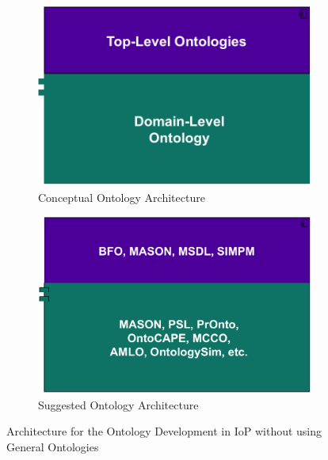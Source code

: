 \documentclass{guideline/sty/rapport}
\begin{document}
\begin{figure}[H]
    \begin{subfigure}[t]{0.45\textwidth}
        \includegraphics[width=\textwidth,]{images/abstractarchitecture2_guideline.pdf}
        \caption{Conceptual Ontology Architecture}
        \label{fig:abstractarchitecture2guideline}
    \end{subfigure}
    \hfill
    \begin{subfigure}[t]{0.45\textwidth}
        \includegraphics[width=\textwidth]{images/suggestedarch2_guidelines.pdf}
        \caption{Suggested Ontology Architecture}
        \label{fig:suggestedarch2_guidelines}
    \end{subfigure}
    \caption{Architecture for the Ontology Development in IoP without using General Ontologies}
    \label{fig:ontologyarchitecture_withoutgeneralontologies}
\end{figure}
\end{document}

